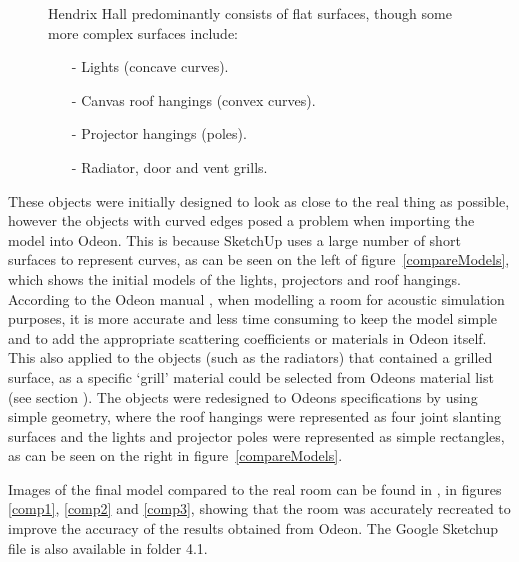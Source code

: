 \documentclass[../../main.tex]{subfiles}
\begin{document}
			\begin{figure}[H]
			Hendrix Hall predominantly consists of flat surfaces, though some more complex surfaces include:
			\begin{itemize}
				\item[-] Lights (concave curves).
				\item[-] Canvas roof hangings (convex curves).
				\item[-] Projector hangings (poles).
				\item[-] Radiator, door and vent grills.
			\end{itemize}
			\end{figure}

			These objects were initially designed to look as close to the real thing as possible, however the objects with curved edges posed a problem when importing the model into Odeon. This is because SketchUp uses a large number of short surfaces to represent curves, as can be seen on the left of figure~\ref{compareModels}, which shows the initial models of the lights, projectors and roof hangings. According to the Odeon manual \cite{odeonManual}, when modelling a room for acoustic simulation purposes, it is more accurate and less time consuming to keep the model simple and to add the appropriate scattering coefficients or materials in Odeon itself. This also applied to the objects (such as the radiators) that contained a grilled surface, as a specific `grill' material could be selected from Odeons material list (see section ). The objects were redesigned to Odeons specifications by using simple geometry, where the roof hangings were represented as four joint slanting surfaces and the lights and projector poles were represented as simple rectangles, as can be seen on the right in figure~\ref{compareModels}.

			Images of the final model compared to the real room can be found in , in figures \ref{comp1}, \ref{comp2} and \ref{comp3}, showing that the room was accurately recreated to improve the accuracy of the results obtained from Odeon. The Google Sketchup file is also available in folder 4.1.
\end{document}
